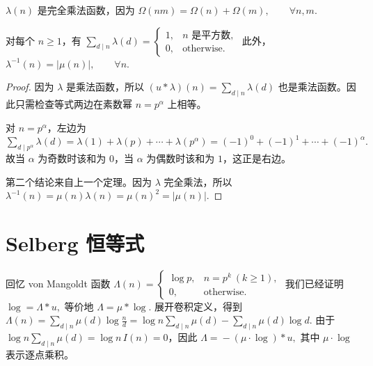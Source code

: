 \begin{remark}
	$\lambda(n)$ 是完全乘法函数，因为
	\(\textstyle \Omega(nm)=\allowbreak{}\Omega(n)+\allowbreak{}\Omega(m),\allowbreak{}\qquad \forall n,\allowbreak{}m.\)
\end{remark}

\begin{theorem}
	对每个 $n\geq 1$，有
	\(\textstyle \sum_{d\mid n}\lambda(d) = \begin{cases} 1, & n\text{ 是平方数},\\ 0, & \text{otherwise}. \end{cases}\)
	此外，
	\(\textstyle \lambda^{-1}(n)=\allowbreak{}|\mu(n)|,\allowbreak{}\qquad \forall n.\)
\end{theorem}

\begin{proof}
	因为 $\lambda$ 是乘法函数，所以
	\(\textstyle (u*\lambda)(n)=\allowbreak{}\sum_{d\mid\allowbreak{} n}\lambda(d)\)
	也是乘法函数。因此只需检查等式两边在素数幂 $n=p^\alpha$ 上相等。

	对 $n=p^\alpha$，左边为
	\(\textstyle \sum_{d\mid\allowbreak{} p^\alpha}\lambda(d) =\allowbreak{} \lambda(1)+\allowbreak{}\lambda(p)+\allowbreak{}\cdots+\allowbreak{}\lambda(p^\alpha) =\allowbreak{} (-1)^0+\allowbreak{}(-1)^1+\allowbreak{}\cdots+\allowbreak{}(-1)^\alpha.\)
	故当 $\alpha$ 为奇数时该和为 $0$，当 $\alpha$ 为偶数时该和为 $1$，这正是右边。

	第二个结论来自上一个定理。因为 $\lambda$ 完全乘法，所以
	\(\textstyle \lambda^{-1}(n) =\allowbreak{} \mu(n)\lambda(n) =\allowbreak{} \mu(n)^2 =\allowbreak{} |\mu(n)|.\)
\end{proof}

\section{Selberg 恒等式}

回忆 von Mangoldt 函数
\(\textstyle \Lambda(n)= \begin{cases} \log p, & n=p^k\ (k\geq 1),\\ 0, & \text{otherwise}. \end{cases}\)
我们已经证明
\(\textstyle \log=\allowbreak{}\Lambda*u,\allowbreak{}\)
等价地
\(\textstyle \Lambda=\allowbreak{}\mu*\log.\)
展开卷积定义，得到
\(\textstyle \Lambda(n) =\allowbreak{} \sum_{d\mid\allowbreak{} n}\mu(d)\log\frac nd =\allowbreak{} \log n\sum_{d\mid\allowbreak{} n}\mu(d) -\sum_{d\mid\allowbreak{} n}\mu(d)\log d.\)
由于 $\log n\sum_{d\mid n}\mu(d)=\log n\,I(n)=0$，因此
\(\textstyle \Lambda=\allowbreak{}-(\mu\cdot\log)*u,\allowbreak{}\)
其中 $\mu\cdot\log$ 表示逐点乘积。

